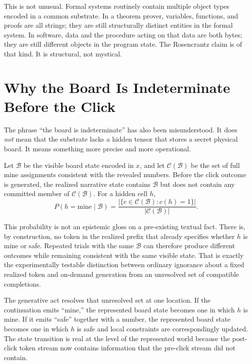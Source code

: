 \documentclass[12pt,a4paper]{article}
\begin{document}
This is not unusual. Formal systems routinely contain multiple object types encoded in a common substrate. In a theorem prover, variables, functions, and proofs are all strings; they are still structurally distinct entities in the formal system. In software, data and the procedure acting on that data are both bytes; they are still different objects in the program state. The Rosencrantz claim is of that kind. It is structural, not mystical.

\section{Why the Board Is Indeterminate Before the Click}

The phrase ``the board is indeterminate'' has also been misunderstood. It does \emph{not} mean that the substrate lacks a hidden tensor that stores a secret physical board. It means something more precise and more operational.

Let $\mathcal{B}$ be the visible board state encoded in $x$, and let $\mathcal{C}(\mathcal{B})$ be the set of full mine assignments consistent with the revealed numbers. Before the click outcome is generated, the realized narrative state contains $\mathcal{B}$ but does not contain any committed member of $\mathcal{C}(\mathcal{B})$. For a hidden cell $h$,
\begin{equation}
P(h=\text{mine}\mid \mathcal{B}) =
\frac{|\{c \in \mathcal{C}(\mathcal{B}) : c(h)=1\}|}{|\mathcal{C}(\mathcal{B})|}.
\end{equation}

This probability is not an epistemic gloss on a pre-existing textual fact. There is, by construction, no token in the realized prefix that already specifies whether $h$ is mine or safe. Repeated trials with the same $\mathcal{B}$ can therefore produce different outcomes while remaining consistent with the same visible state. That is exactly the experimentally testable distinction between ordinary ignorance about a fixed realized token and on-demand generation from an unresolved set of compatible completions.

The generative act resolves that unresolved set at one location. If the continuation emits ``mine,'' the represented board state becomes one in which $h$ is mine. If it emits ``safe'' together with a number, the represented board state becomes one in which $h$ is safe and local constraints are correspondingly updated. The state transition is real at the level of the represented world because the post-click token stream now contains information that the pre-click stream did not contain.
\end{document}
